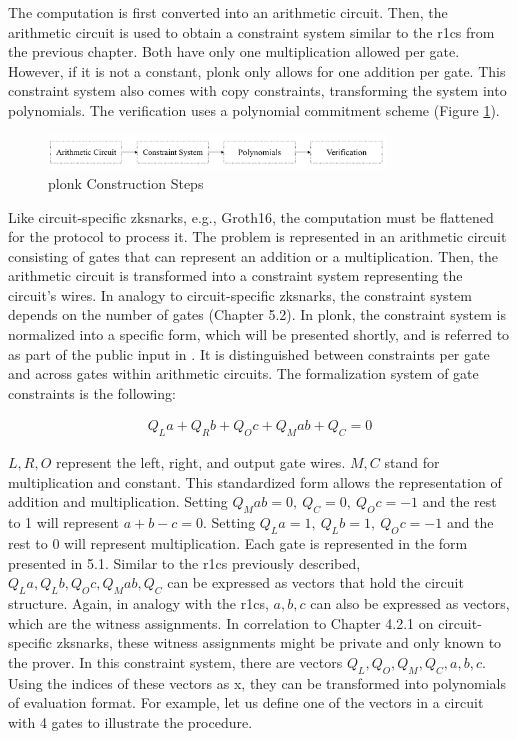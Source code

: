 The computation is first converted into an arithmetic circuit. Then, the arithmetic circuit is used to obtain a constraint system similar to the \acrshort{r1cs} from the previous chapter. Both have only one multiplication allowed per gate. However, if it is not a constant, \acrshort{plonk} only allows for one addition per gate. This constraint system also comes with copy constraints, transforming the system into polynomials. The verification uses a polynomial commitment scheme (Figure \ref{fig:plonk}).

\begin{figure}[hbt]
	\centering
		\includegraphics[width=0.8\textwidth]{Pictures/plonk_process.png}
	\caption{\acrshort{plonk} Construction Steps}
	\label{fig:plonk}
\end{figure}

Like circuit-specific \acrshort{zksnark}s, e.g., Groth16, the computation must be flattened for the protocol to process it. The problem is represented in an arithmetic circuit consisting of gates that can represent an addition or a multiplication. Then, the arithmetic circuit is transformed into a constraint system representing the circuit's wires. In analogy to circuit-specific \acrshort{zksnark}s, the constraint system depends on the number of gates (Chapter 5.2). In \acrshort{plonk}, the constraint system is normalized into a specific form, which will be presented shortly, and is referred to as part of the public input in \citet{PLONKcryptoeprint:2019/953}. 
It is distinguished between constraints per gate and across gates within arithmetic circuits. The formalization system of gate constraints is the following:

\begin{align}
    Q_{L}a + Q_{R}b + Q_{O}c + Q_{M}ab + Q_C = 0
\end{align}

\(L, R, O\) represent the left, right, and output gate wires. \(M, C\) stand for multiplication and constant. This standardized form allows the representation of addition and multiplication. Setting \(Q_{M}ab = 0, \ Q_C=0, \ Q_{O}c = -1 \) and the rest to 1 will represent \(a + b - c = 0\). Setting \(Q_{L}a =1,\ Q_{L}b =1,\ Q_{O}c = -1\) and the rest to 0 will represent multiplication. Each gate is represented in the form presented in 5.1. Similar to the \acrshort{r1cs} previously described, \(Q_{L}a, Q_{L}b, Q_{O}c, Q_{M}ab, Q_C\) can be expressed as vectors that hold the circuit structure. Again, in analogy with the \acrshort{r1cs}, \(a, b, c\) can also be expressed as vectors, which are the witness assignments. In correlation to Chapter 4.2.1 on circuit-specific \acrshort{zksnark}s, these witness assignments might be private and only known to the prover.
In this constraint system, there are vectors \(Q_{L}, Q_{O}, Q_{M}, Q_C, a, b, c\). Using the indices of these vectors as x, they can be transformed into polynomials of evaluation format. For example, let us define one of the vectors in a circuit with 4 gates to illustrate the procedure. 

